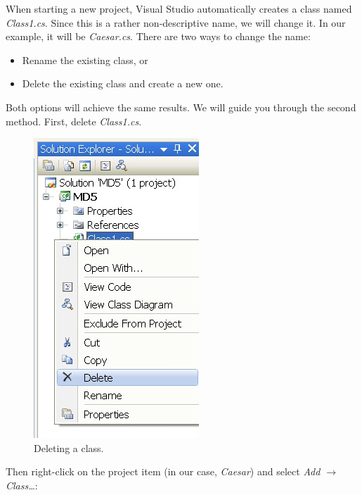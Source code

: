 When starting a new project, Visual Studio automatically creates a class named \textit{Class1.cs}. Since this is a rather non-descriptive name, we will change it. In our example, it will be \textit{Caesar.cs}. There are two ways to change the name:

\begin{itemize}
	\item Rename the existing class, or
	\item Delete the existing class and create a new one.
\end{itemize}

\noindent Both options will achieve the same results. We will guide you through the second method. First, delete \textit{Class1.cs}.

\begin{figure}[h!]
	\centering
		\includegraphics{figures/new_class.jpg}
	\caption{Deleting a class.}
	\label{fig:new_class}
\end{figure}
\clearpage

\noindent Then right-click on the project item (in our case, \textit{Caesar}) and select \textit{Add $\rightarrow$ Class\ldots }:

